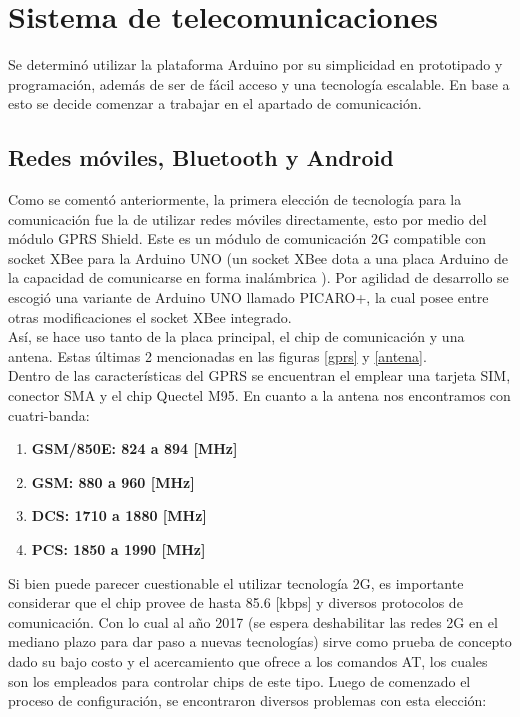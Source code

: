 \chapter{Sistema de telecomunicaciones}\label{comunicacion}
Se determinó utilizar la plataforma Arduino por su simplicidad en prototipado y programación, además de ser de fácil acceso y una tecnología escalable. En base a esto se decide comenzar a trabajar en el apartado de comunicación.
\section{Redes móviles, Bluetooth y Android}
Como se comentó anteriormente, la primera elección de tecnología para la comunicación fue la de utilizar redes móviles directamente, esto por medio del módulo GPRS Shield. Este es un módulo de comunicación 2G compatible con socket XBee para la Arduino UNO (un socket XBee dota a una placa Arduino de la capacidad de comunicarse en forma inalámbrica \cite{xbee_info}). Por agilidad de desarrollo se escogió una variante de Arduino UNO llamado PICARO+, la cual posee entre otras modificaciones el socket XBee integrado.\\
Así, se hace uso tanto de la placa principal, el chip de comunicación y una antena. Estas últimas 2 mencionadas en las figuras \ref{gprs} y \ref{antena}.\\
Dentro de las características del GPRS se encuentran el emplear una tarjeta SIM, conector SMA y el chip Quectel M95. En cuanto a la antena nos encontramos con cuatri-banda: 
\begin{enumerate}
	\item\textbf{GSM/850E: 824 a 894 [MHz]}
	\item\textbf{GSM: 880 a 960 [MHz]}
	\item\textbf{DCS: 1710 a 1880 [MHz]}
	\item\textbf{PCS: 1850 a 1990 [MHz]}
\end{enumerate}

\newpage
Si bien puede parecer cuestionable el utilizar tecnología 2G, es importante considerar que el chip provee de hasta 85.6 [kbps] y diversos protocolos de comunicación. Con lo cual al año 2017 (se espera deshabilitar las redes 2G en el mediano plazo para dar paso a nuevas tecnologías) sirve como prueba de concepto dado su bajo costo y el acercamiento que ofrece a los comandos AT, los cuales son los empleados para controlar chips de este tipo.
Luego de comenzado el proceso de configuración, se encontraron diversos problemas con esta elección:

